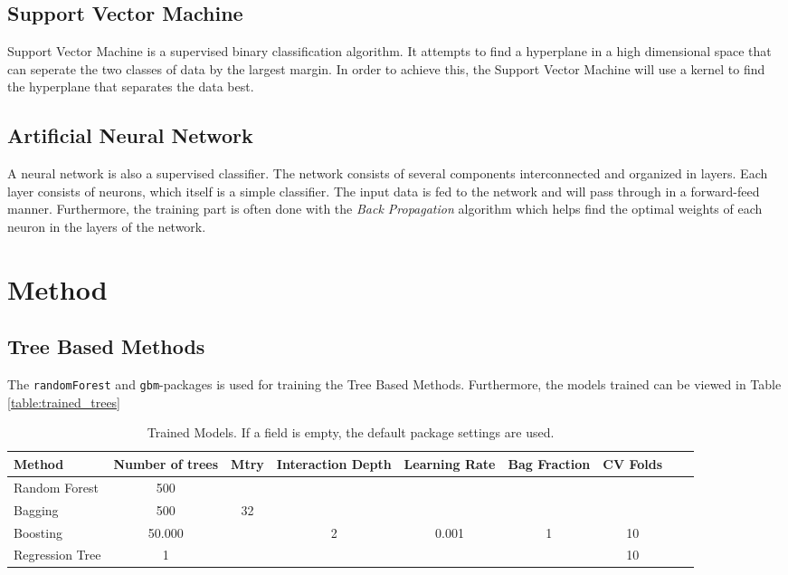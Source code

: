 \documentclass[a4paper,10pt]{article}
\begin{document}
\subsection{Support Vector Machine }
Support Vector Machine is a supervised binary classification algorithm. It
attempts to find a hyperplane in a high dimensional space that can seperate
the two classes of data by the largest margin. In order to achieve this, the
Support Vector Machine will use a kernel to find the hyperplane that separates
the data best. \\

\subsection{Artificial Neural Network}
A neural network is also a supervised classifier. The network consists
of several components interconnected and organized in layers. Each layer
consists of neurons, which itself is a simple classifier. The input data
is fed to the network and will pass through in a forward-feed manner.
Furthermore, the training part is often done with the \textit{Back Propagation}
algorithm which helps find the optimal weights of each neuron in
the layers of the network.

\section{Method}
\subsection{Tree Based Methods}
The \texttt{randomForest} and \texttt{gbm}-packages is used for training
the Tree Based Methods. Furthermore,
the models trained can be viewed in Table {\ref{table:trained_trees}}\\

\begin{table}[H]
\centering
\begin{tabular}{l*{7}{c}r}
  Method              & Number of trees & Mtry & Interaction Depth & Learning Rate & Bag Fraction & CV Folds\\
  \hline
  Random Forest & 500 \\
  Bagging & 500 & 32 \\
  Boosting & 50.000 &  & 2 & 0.001 & 1 & 10 \\
  Regression Tree & 1 &  &   &   &  & 10  \\
\end{tabular}
\caption{Trained Models. If a field is empty, the default package settings are used.}
\label{table:spam_models}
\end{table}
\end{document}
